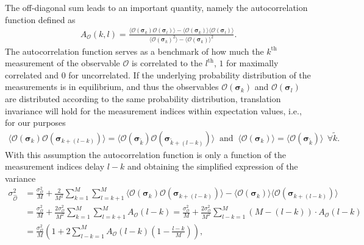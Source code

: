 The off-diagonal sum leads to an important quantity, namely the autocorrelation function defined as
\begin{align*}
    A_\mathcal{O}(k,l)=\frac{\langle \mathcal{O}(\bm{\sigma}_k)\mathcal{O}(\bm{\sigma}_l) \rangle - \langle \mathcal{O}(\bm{\sigma}_k) \rangle\langle \mathcal{O}(\bm{\sigma}_l) \rangle}
                            {\langle \mathcal{O}(\bm{\sigma}_k)^2\rangle - \langle \mathcal{O}(\bm{\sigma}_k) \rangle^2}.
\end{align*}
The autocorrelation function serves as a benchmark of how much the $k^\text{th}$ measurement of the observable $\mathcal{O}$ is correlated to the $l^\text{th}$, 
$1$ for maximally correlated and $0$ for uncorrelated. If the underlying probability distribution of the measurements is in equilibrium, and thus the observables 
$\mathcal{O}(\bm{\sigma}_k)$ and $\mathcal{O}(\bm{\sigma}_l)$ are distributed according to the same probability distribution, translation invariance will hold 
for the measurement indices within expectation values, i.e., for our purposes 
\begin{align*}
    \langle \mathcal{O}(\bm{\sigma}_k) \mathcal{O}(\bm{\sigma}_{k+(l-k)}) \rangle \!=\! \langle \mathcal{O}(\bm{\sigma}_{\tilde{k}}) \mathcal{O}(\bm{\sigma}_{\tilde{k}+(l-k)}) \rangle \  
    \text{ and } \  \langle \mathcal{O}(\bm{\sigma}_k) \rangle \!=\! \langle \mathcal{O}(\bm{\sigma}_{\tilde{k}}) \rangle \  \  \forall\tilde{k}.
\end{align*}
With this assumption the autocorrelation function is only a function of the measurement indices delay $l\!-\!k$ and obtaining the simplified
expression of the variance
\begin{align*}
    \sigma_{\hat{\mathcal{O}}}^2 &= \frac{\sigma^2_\mathcal{O}}{M} 
                                   +\frac{2}{M^2}\sum_{k=1}^M\sum_{l=k+1}^M\langle \mathcal{O}(\bm{\sigma}_k) \mathcal{O}(\bm{\sigma}_{k+(l-k)}) \rangle-\langle \mathcal{O}(\bm{\sigma}_k) \rangle\langle \mathcal{O}(\bm{\sigma}_{k+(l-k)}) \rangle\\
                                 &= \frac{\sigma^2_\mathcal{O}}{M} 
                                   +\frac{2\sigma^2_\mathcal{O}}{M^2}\sum_{k=1}^M\sum_{l=k+1}^{M}A_\mathcal{O}(l\!-\!k)
                                  = \frac{\sigma^2_\mathcal{O}}{M} 
                                   +\frac{2\sigma^2_\mathcal{O}}{M^2}\sum_{l\!-\!k=1}^M(M-(l\!-\!k))\cdot A_\mathcal{O}(l\!-\!k)\\
                                 &=\frac{\sigma^2_\mathcal{O}}{M}\left(1+2\sum_{l\!-\!k=1}^MA_\mathcal{O}(l\!-\!k)\left(1-\frac{l\!-\!k}{M}\right)\right),
\end{align*}
